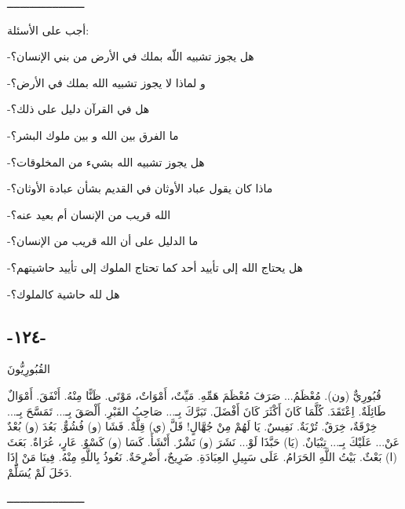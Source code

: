 \documentclass[a5paper]{article}
\begin{document}
ــــــــــــــــــــــــ

أجب على الأسئلة:

-هل يجوز تشبيه اللّه بملك في الأرض من بني الإنسان؟

-و لماذا لا يجوز تشبيه الله بملك في الأرض؟

-هل في القرآن دليل على ذلك؟

-ما الفرق بين الله و بين ملوك البشر؟

-هل يجوز تشبيه الله بشيء من المخلوقات؟

-ماذا كان يقول عباد الأوثان في القديم بشأن عبادة الأوثان؟

-الله قريب من الإنسان أم بعيد عنه؟

-ما الدليل على أن الله قريب من الإنسان؟

-هل يحتاج الله إلى تأييد أحد كما تحتاج الملوك إلى تأييد حاشيتهم؟

-هل لله حاشية كالملوك؟ 

\subsection{-١٢٤-}
القُبُورِيُّونَ

قُبُورِيٌّ (ون). مُعْظَمُ... صَرَفَ مُعْظَمَ هَمِّهِ. مَيِّتٌ، أَمْوَاتٌ، مَوْتَى. ظَنًّا مِنْهُ. أَنْفَقَ. أَمْوَالٌ طَائِلَةٌ. اِعْتَقَدَ. كُلَّمَا كَانَ أَكْثَرَ كَانَ أَفْضَلَ. تَبَرَّكَ بِـ... صَاحِبُ القَبْرِ. أَلْصَقَ بِـ... تَمَسَّحَ بِـ... خِرْقَةٌ، خِرَقٌ. تُرْبَةٌ. نَفِيسٌ. يَا لَهُمْ مِنْ جُهَّالٍ! قَلَّ (ي) قِلَّةٌ. فَشَا (و) فُشُوٌّ. بَعُدَ (و) بُعْدٌ عَنْ... عَلَيْكَ بِـ... تِبْيَانٌ. (يَا) حَبَّذَا لَوْ... نَشَرَ (و) نَشْرٌ. أَنْشَأَ. كَسَا (و) كَسْوٌ. عَارٍ، عُرَاةٌ. بَعَثَ (ا) بَعْثٌ. بَيْتُ اللَّهِ الحَرَامُ. عَلَى سَبِيلِ العِبَادَةِ. ضَرِيحٌ، أَضْرِحَةٌ. نَعُوذُ بِاللَّهِ مِنْهُ. فِينَا مَنْ إِذَا دَخَلَ لَمْ يُسَلِّمْ.

ــــــــــــــــــــــــ
\end{document}
